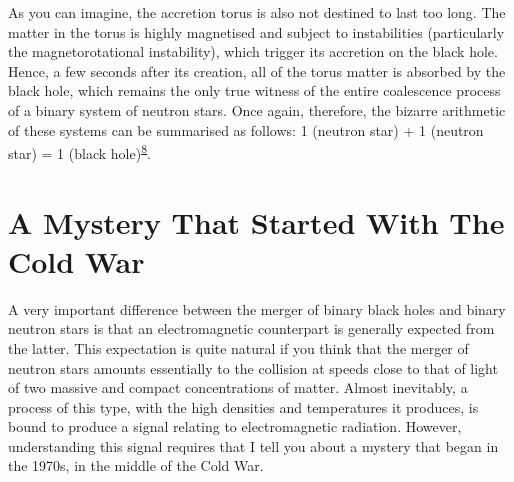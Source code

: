 As you can imagine, the accretion torus is also not destined to last too long. The
matter in the torus is highly magnetised and subject to instabilities (particularly the
magnetorotational instability), which trigger its accretion on the
black hole. Hence, a few seconds after its creation, all of the torus matter is absorbed
by the black hole, which remains the only true witness of the entire coalescence process
of a binary system of neutron stars. Once again, therefore, the bizarre arithmetic of
these systems can be summarised as follows: 1 (neutron star) + 1 (neutron star) = 1
(black hole)\textsuperscript{\hyperlink{note:08-08}{8}}.

\section{A Mystery That Started With The Cold War}\label{sec:08-gamma}

A very important difference between the merger of binary black holes and binary neutron
stars is that an electromagnetic counterpart is generally expected
from the latter. This expectation is quite natural if you think that the merger of
neutron stars amounts essentially to the collision at speeds close to that of light of
two massive and compact concentrations of matter. Almost inevitably, a process of this
type, with the high densities and temperatures it produces, is bound to produce a signal
relating to electromagnetic radiation. However, understanding this
signal requires that I tell you about a mystery that began in the 1970s, in the middle
of the Cold War.

